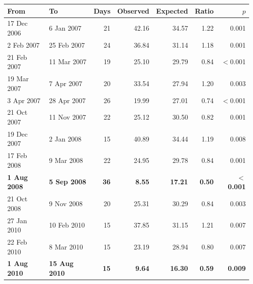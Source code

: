 \begin{tabular}{@{}llrrrrr@{}}
\toprule
From & To & Days & Observed & Expected & Ratio & $p$ \\
\midrule
17 Dec 2006 & 6 Jan 2007 & 21 & 42.16 & 34.57 & 1.22 & 0.001 \\
2 Feb 2007 & 25 Feb 2007 & 24 & 36.84 & 31.14 & 1.18 & 0.001 \\
21 Feb 2007 & 11 Mar 2007 & 19 & 25.10 & 29.79 & 0.84 & $<$0.001 \\
19 Mar 2007 & 7 Apr 2007 & 20 & 33.54 & 27.94 & 1.20 & 0.003 \\
3 Apr 2007 & 28 Apr 2007 & 26 & 19.99 & 27.01 & 0.74 & $<$0.001 \\
21 Oct 2007 & 11 Nov 2007 & 22 & 25.12 & 30.50 & 0.82 & 0.001 \\
19 Dec 2007 & 2 Jan 2008 & 15 & 40.89 & 34.44 & 1.19 & 0.008 \\
17 Feb 2008 & 9 Mar 2008 & 22 & 24.95 & 29.78 & 0.84 & 0.001 \\
\textbf{1 Aug 2008} & \textbf{5 Sep 2008} & \textbf{36} & \textbf{8.55} & \textbf{17.21} & \textbf{0.50} & \textbf{$<$0.001} \\
21 Oct 2008 & 9 Nov 2008 & 20 & 25.31 & 30.29 & 0.84 & 0.003 \\
27 Jan 2010 & 10 Feb 2010 & 15 & 37.85 & 31.15 & 1.21 & 0.007 \\
22 Feb 2010 & 8 Mar 2010 & 15 & 23.19 & 28.94 & 0.80 & 0.007 \\
\textbf{1 Aug 2010} & \textbf{15 Aug 2010} & \textbf{15} & \textbf{9.64} & \textbf{16.30} & \textbf{0.59} & \textbf{0.009} \\
\bottomrule
\end{tabular}
